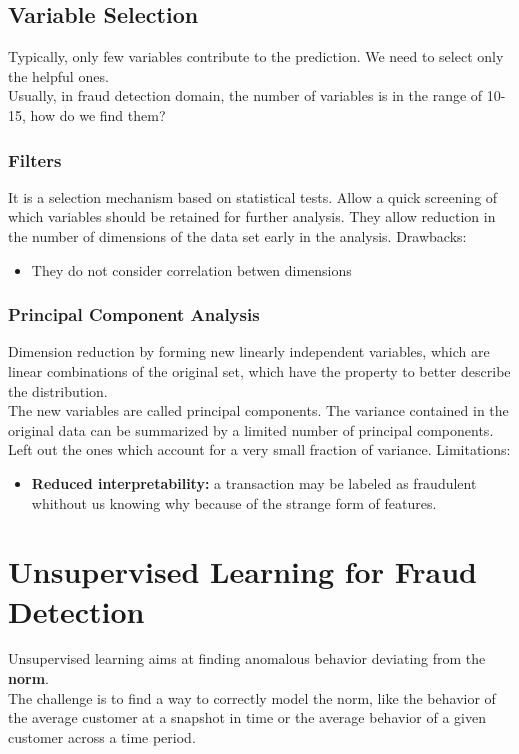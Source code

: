     \subsection{Variable Selection}
        Typically, only few variables contribute to the prediction. We need to select only the helpful ones.\\
        Usually, in fraud detection domain, the number of variables is in the range of 10-15, how do we find them?
        \subsubsection{Filters}
            It is a selection mechanism based on statistical tests. Allow a quick screening of which variables should be retained for further analysis. They allow reduction in the number of dimensions of the data set early in the analysis.
            Drawbacks:
            \begin{itemize}
                \item They do not consider correlation betwen dimensions
            \end{itemize}
        \subsubsection{Principal Component Analysis}
            Dimension reduction by forming new linearly independent variables, which are linear combinations of the original set, which have the property to better describe the distribution.\\
            The new variables are called principal components. The variance contained in the original data can be summarized by a limited number of principal components. Left out the ones which account for a very small fraction of variance.
            Limitations:
            \begin{itemize}
                \item \textbf{Reduced interpretability:} a transaction may be labeled as fraudulent whithout us knowing why because of the strange form of features.
            \end{itemize}
\section{Unsupervised Learning for Fraud Detection}
    Unsupervised learning aims at finding anomalous behavior deviating from the \textbf{norm}.\\
    The challenge is to find a way to correctly model the norm, like the behavior of the average customer at a snapshot in time or the average behavior of a given customer across a time period.
